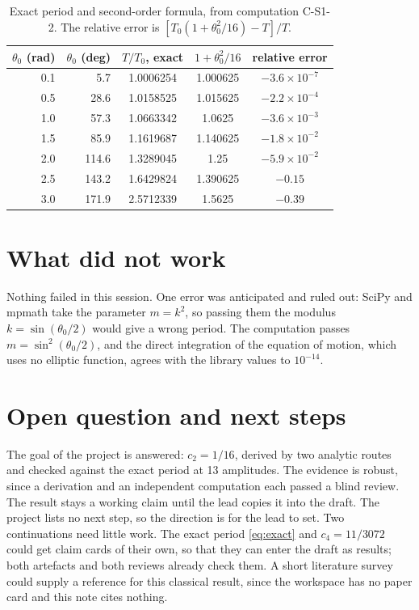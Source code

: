 \documentclass[11pt]{article}
\begin{document}
\begin{table}[ht]
\centering
\begin{tabular}{rrccc}
\hline
$\theta_0$ (rad) & $\theta_0$ (deg) & $T/T_0$, exact & $1 + \theta_0^2/16$ & relative error \\
\hline
0.1 & 5.7   & 1.0006254 & 1.000625 & $-3.6\times10^{-7}$ \\
0.5 & 28.6  & 1.0158525 & 1.015625 & $-2.2\times10^{-4}$ \\
1.0 & 57.3  & 1.0663342 & 1.0625   & $-3.6\times10^{-3}$ \\
1.5 & 85.9  & 1.1619687 & 1.140625 & $-1.8\times10^{-2}$ \\
2.0 & 114.6 & 1.3289045 & 1.25     & $-5.9\times10^{-2}$ \\
2.5 & 143.2 & 1.6429824 & 1.390625 & $-0.15$ \\
3.0 & 171.9 & 2.5712339 & 1.5625   & $-0.39$ \\
\hline
\end{tabular}
\caption{Exact period and second-order formula, from computation C-S1-2. The
relative error is $[T_0(1 + \theta_0^2/16) - T]/T$.}
\label{tab:accuracy}
\end{table}

\section{What did not work}
Nothing failed in this session. One error was anticipated and ruled out: SciPy
and mpmath take the parameter $m = k^2$, so passing them the modulus
$k = \sin(\theta_0/2)$ would give a wrong period. The computation passes
$m = \sin^2(\theta_0/2)$, and the direct integration of the equation of
motion, which uses no elliptic function, agrees with the library values to
$10^{-14}$.

\section{Open question and next steps}
The goal of the project is answered: $c_2 = 1/16$, derived by two analytic
routes and checked against the exact period at 13 amplitudes. The evidence is
robust, since a derivation and an independent computation each passed a blind
review. The result stays a working claim until the lead copies it into the
draft. The project lists no next step, so the direction is for the lead to set.
Two continuations need little work. The exact period \eqref{eq:exact} and
$c_4 = 11/3072$ could get claim cards of their own, so that they can enter the
draft as results; both artefacts and both reviews already check them. A short
literature survey could supply a reference for this classical result, since
the workspace has no paper card and this note cites nothing.



\end{document}
